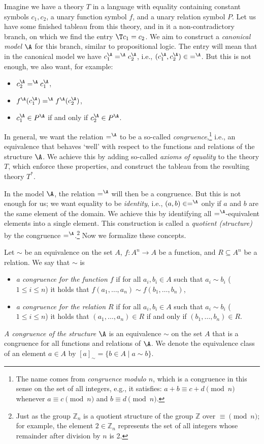 Imagine we have a theory $T$ in a language with equality containing constant symbols $c_1,c_2$, a unary function symbol $f$, and a unary relation symbol $P$. Let us have some finished tableau from this theory, and in it a non-contradictory branch, on which we find the entry $\T c_1=c_2$. We aim to construct a \emph{canonical model} $\A$ for this branch, similar to propositional logic. The entry will mean that in the canonical model we have $c_1^\A =^\A c_2^\A$, i.e., $(c_1^\A,c_2^\A)\in {=^\A}$. But this is not enough, we also want, for example:
\begin{itemize}
    \item $c_2^\A =^\A c_1^\A$,
    \item $f^\A(c_1^\A) =^\A f^\A(c_2^\A)$,
    \item $c_1^\A \in P^\A$ if and only if $c_2^\A \in P^\A$.
\end{itemize}
In general, we want the relation $=^\A$ to be a so-called \emph{congruence},\footnote{The name comes from \emph{congruence modulo $n$}, which is a congruence in this sense on the set of all integers, e.g., it satisfies: $a+b\equiv c+d\pmod n$ whenever $a\equiv c\pmod n$ and $b\equiv d\pmod n$.} i.e., an equivalence that behaves `well' with respect to the functions and relations of the structure $\A$. We achieve this by adding so-called \emph{axioms of equality} to the theory $T$, which enforce these properties, and construct the tableau from the resulting theory $T^*$.

In the model $\A$, the relation $=^\A$ will then be a congruence. But this is not enough for us; we want equality to be \emph{identity}, i.e., $(a,b)\in=^\A$ only if $a$ and $b$ are the same element of the domain. We achieve this by identifying all $=^\A$-equivalent elements into a single element. This construction is called a \emph{quotient (structure)} by the congruence $=^\A$.\footnote{Just as the group $\mathbb Z_n$ is a quotient structure of the group $\mathbb Z$ over $\equiv\pmod n$; for example, the element $2\in\mathbb Z_n$ represents the set of all integers whose remainder after division by $n$ is 2.} Now we formalize these concepts.

\begin{definition}[Congruence]
    Let $\sim$ be an equivalence on the set $A$, $f\colon A^n\to A$ be a function, and $R\subseteq A^n$ be a relation. We say that $\sim$ is
    \begin{itemize}
        \item \emph{a congruence for the function $f$} if for all $a_i,b_i\in A$ such that $a_i\sim b_i$ ($1\leq i\leq n$) it holds that $f(a_1,\dots,a_n)\sim f(b_1,\dots,b_n)$,
        \item \emph{a congruence for the relation $R$} if for all $a_i,b_i\in A$ such that $a_i\sim b_i$ ($1\leq i\leq n$) it holds that $(a_1,\dots,a_n)\in R$ if and only if $(b_1,\dots,b_n)\in R$.
    \end{itemize}    
    \emph{A congruence of the structure} $\A$ is an equivalence $\sim$ on the set $A$ that is a congruence for all functions and relations of $\A$. We denote the equivalence class of an element $a\in A$ by $[a]_\sim=\{b\in A\mid a\sim b\}$.
\end{definition}

